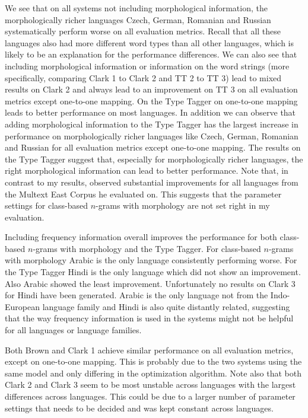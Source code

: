 \documentclass[11pt]{article}
\begin{document}
{We see that on all systems not including morphological information, the morphologically richer languages Czech, German, Romanian and Russian systematically perform worse on all evaluation metrics. Recall that all these languages also had more different word types than all other languages, which is likely to be an explanation for the performance differences. We can also see that including morphological information or information on the word strings (more specifically, comparing Clark 1 to Clark 2 and TT 2 to TT 3) lead to mixed results on Clark 2 and always lead to an improvement on TT 3 on all evaluation metrics except one-to-one mapping. On the Type Tagger on one-to-one mapping leads to better performance on most languages. In addition we can observe that adding morphological information to the Type Tagger has the largest increase in performance on morphologically richer languages like Czech, German, Romanian and Russian for all evaluation metrics except one-to-one mapping. The results on the Type Tagger suggest that, especially for morphologically richer languages, the right morphological information can lead to better performance. Note that, in contrast to my results, \cite{clark2003cda} observed substantial improvements for all languages from the Multext East Corpus he evaluated on. This suggests that the parameter settings for class-based $n$-grams with morphology are not set right in my evaluation.

Including frequency information overall improves the performance for both class-based $n$-grams with morphology and the Type Tagger. For class-based $n$-grams with morphology Arabic is the only language consistently performing worse. For the Type Tagger Hindi is the only language which did not show an improvement. Also Arabic showed the least improvement. Unfortunately no results on Clark 3 for Hindi have been generated. Arabic is the only language not from the Indo-European language family and Hindi is also quite distantly related, suggesting that the way frequency information is used in the systems might not be helpful for all languages or language families. 

Both Brown and Clark 1 achieve similar performance on all evaluation metrics, except on one-to-one mapping. This is probably due to the two systems using the same model and only differing in the optimization algorithm. Note also that both Clark 2 and Clark 3 seem to be most unstable across languages with the largest differences across languages. This could be due to a larger number of parameter settings that needs to be decided and was kept constant across languages.

}
\end{document}
